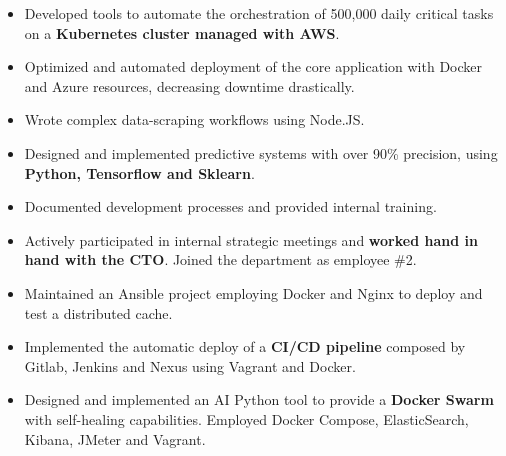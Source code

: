 \documentclass[10pt,a4paper]{altacv}
\begin{document}
\begin{itemize}
	\item Developed tools to automate the orchestration of 500,000 daily critical tasks on a \textbf{Kubernetes cluster managed with AWS}.
	\item Optimized and automated deployment of the core application with Docker and Azure resources, decreasing downtime drastically.
	\item Wrote complex data-scraping workflows using Node.JS.
	\item Designed and implemented predictive systems with over 90\% precision, using \textbf{Python, Tensorflow and Sklearn}.
	\item Documented development processes and provided internal training.
	\item Actively participated in internal strategic meetings and \textbf{worked hand in hand with the CTO}. Joined the department as employee \#2.
\end{itemize}

\divider

\begin{itemize}
	\item Maintained an Ansible project employing Docker and Nginx to deploy and test a distributed cache.
	\item Implemented the automatic deploy of a \textbf{CI/CD pipeline} composed by Gitlab, Jenkins and Nexus using Vagrant and Docker.
	\item Designed and implemented an AI Python tool to provide a \textbf{Docker Swarm} with self-healing capabilities. Employed Docker Compose, ElasticSearch, Kibana, JMeter and Vagrant.
\end{itemize}

%
%
\end{document}
